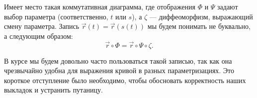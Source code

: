 Имеет место такая коммутативная диаграмма, где отображения $\Phi$ и $\Psi$ задают выбор параметра (соответственно, $t$ или $s$), а $\zeta$ --- диффеоморфизм, выражающий смену параметра. Запись $\vec{r}(t) = \vec{r}(s(t))$ мы будем понимать не буквально, а следующим образом:
\[
	\vec{r} \circ \Phi = \vec{r} \circ \Psi \circ \zeta.
\]

В курсе мы будем довольно часто пользоваться такой записью, так как она чрезвычайно удобна для выражения кривой в разных параметризациях. Это короткое отступление было необходимо, чтобы обосновать корректность наших выкладок и устранить путаницу.

